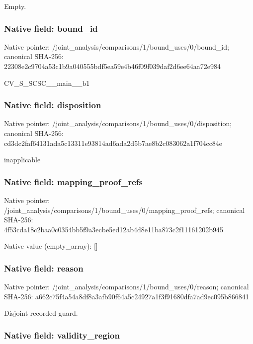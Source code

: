 \documentclass[10pt,a4paper]{article}
\begin{document}
Empty.


\subsubsection{Native field: bound\_id}


Native pointer: /joint\_analysis/comparis\allowbreak{}ons/1/bound\_uses/0/bound\allowbreak{}\_id; canonical SHA-256: 22308e2c9704a53c1b9a0405\allowbreak{}55bdf5ea59e4b46f09f039da\allowbreak{}f2d6ee64aa72e984


CV\_S\_SCSC\_\_main\_\_b1


\subsubsection{Native field: disposition}


Native pointer: /joint\_analysis/comparis\allowbreak{}ons/1/bound\_uses/0/dispo\allowbreak{}sition; canonical SHA-256: cd3dc2faf64131ada5c13311\allowbreak{}e93814ad6ada2d5b7ae8b2c0\allowbreak{}83062a1f704cc84e


inapplicable


\subsubsection{Native field: mapping\_proof\_refs}


Native pointer: /joint\_analysis/comparis\allowbreak{}ons/1/bound\_uses/0/mappi\allowbreak{}ng\_proof\_refs; canonical SHA-256: 4f53cda18c2baa0c0354bb5f\allowbreak{}9a3ecbe5ed12ab4d8e11ba87\allowbreak{}3c2f11161202b945



Native value (empty\_array): []



\subsubsection{Native field: reason}


Native pointer: /joint\_analysis/comparis\allowbreak{}ons/1/bound\_uses/0/reaso\allowbreak{}n; canonical SHA-256: a662c75f4a54a8df8a3afb90\allowbreak{}f64a5c24927a1f3f91680dfa\allowbreak{}7ad9ec095b866841


Disjoint recorded guard.


\subsubsection{Native field: validity\_region}
\end{document}

